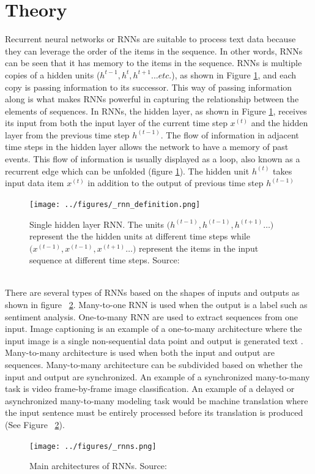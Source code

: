 \documentclass[sigconf, nonacm, natbib, screen, balance=False]{acmart}
\begin{document}
\section{Theory}\label{sec:theory}
Recurrent neural networks or RNNs \citep{Rumelhart:1986we} are suitable to process text data because they can leverage the order of the items in the sequence. In other words, RNNs can be seen that it has memory to the items in the sequence. RNNs is multiple copies of a hidden units ($h^{t-1}, h^{t}, h^{t+1}...etc.$), as shown in Figure \ref{fig:RNN_definiton}, and each copy is passing information to its successor. This way of passing information along is what makes RNNs powerful in capturing the relationship between the elements of sequences. In RNNs, the hidden layer, as shown in Figure \ref{fig:RNN_definiton}, receives its input from both the input layer of the current time step $x^{(t)}$ and the hidden layer from the previous time step $h^{(t-1)}$. The flow of information in adjacent time steps in the hidden layer allows the network to have a memory of past events. This flow of information is usually displayed as a loop, also known as a recurrent edge which can be unfolded (figure \ref{fig:RNN_definiton}). The hidden unit $h^{(t)}$ takes input data item $x^{(t)}$ in addition to the output of previous time step $h^{(t-1)}$

\begin{figure}
  \centering
  \texttt{[image: ../figures/\_rnn\_definition.png]}
  \caption{Single hidden layer RNN. The units $\big( h^{(t-1)}, h^{(t-1)}, h^{(t+1)} \dots \big)$ represent the the hidden units at different time steps while $\big( x^{(t-1)}, x^{(t-1)}, x^{(t+1)} \dots \big)$ represent the items in the input sequence at different time steps. Source: \citep{raschka2019python}}
  \label{fig:RNN_definiton}
\end{figure}
\hfill\\
There are several types of RNNs based on the shapes of inputs and outputs as shown in figure ~\ref{fig:rnns_types}. Many-to-one RNN is used when the output is a label such as sentiment analysis. One-to-many RNN are used to extract sequences from one input. Image captioning is an example of a one-to-many architecture where the input image is a single non-sequential data point and output is generated text \citep{Vinyals2015ShowAT}. Many-to-many architecture is used when both the input and output are sequences. Many-to-many architecture can be subdivided based on whether the input and output are synchronized. An example of a synchronized many-to-many task is video frame-by-frame image classification. An example of a delayed or asynchronized many-to-many modeling task would be machine translation where the input sentence must be entirely processed before its translation is produced (See Figure ~\ref{fig:rnns_types}).
\begin{figure}[ht]
  \centering
  \texttt{[image: ../figures/\_rnns.png]}
  \caption{Main architectures of RNNs. Source:\citep{raschka2019python}}
  \label{fig:rnns_types}
\end{figure}
\hfill\\
\end{document}
